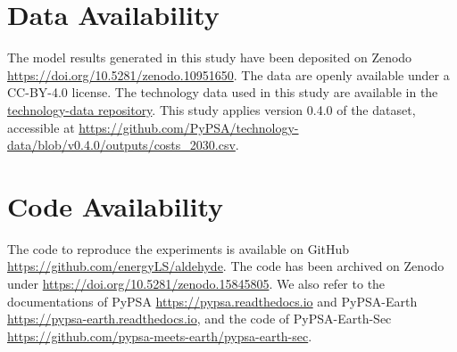 \documentclass[5p,numafflabel]{elsarticle}
\begin{document}
\section*{Data Availability}
The model results generated in this study have been deposited on Zenodo \href{https://doi.org/10.5281/zenodo.10951650}{https://doi.org/10.5281/zenodo.10951650}\cite{Schumm2024a}. The data are openly available under a CC-BY-4.0 license.
The technology data used in this study are available in the \href{https://github.com/pypsa/technology-data}{technology-data repository}. This study applies version 0.4.0 of the dataset, accessible at \href{https://github.com/PyPSA/technology-data/blob/v0.4.0/outputs/costs_2030.csv}{https://github.com/PyPSA/technology-data/blob/v0.4.0/outputs/costs\_2030.csv}.

\section*{Code Availability}
The code to reproduce the experiments is available on GitHub \href{https://github.com/energyLS/aldehyde}{https://github.com/energyLS/aldehyde}.
The code has been archived on Zenodo under \href{https://doi.org/10.5281/zenodo.15845805}{https://doi.org/10.5281/zenodo.15845805}\cite{schumm2025}.
We also refer to the documentations of PyPSA \href{https://pypsa.readthedocs.io}{https://pypsa.readthedocs.io} and PyPSA-Earth \href{https://pypsa-earth.readthedocs.io}{https://pypsa-earth.readthedocs.io}, and the code of PyPSA-Earth-Sec
\href{https://github.com/pypsa-meets-earth/pypsa-earth-sec}{https://github.com/pypsa-meets-earth/pypsa-earth-sec}.
\end{document}
